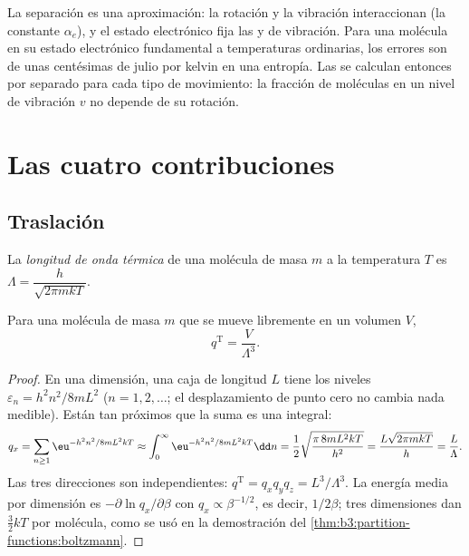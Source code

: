La separación es una aproximación: la rotación y la vibración interaccionan (la
constante $\alpha_e$), y el estado electrónico fija las  y de vibración.
Para una molécula en su estado electrónico fundamental a temperaturas
ordinarias, los errores son de unas centésimas de julio por kelvin en una
entropía. Las  se calculan entonces por separado para cada tipo de movimiento:
la fracción de moléculas en un nivel de vibración $v$ no depende de su
rotación.

\section{Las cuatro contribuciones}

\subsection*{Traslación}

\begin{definition}\label{def:b3:partition-functions:thermal-wavelength}
La \emph{longitud de onda térmica} de una molécula de masa $m$ a la
temperatura $T$ es $\Lambda = \dfrac{h}{\sqrt{2\pi mkT}}$.
\end{definition}

\begin{proposition}\label{prop:b3:partition-functions:q-trans}
Para una molécula de masa $m$ que se mueve libremente en un volumen $V$,
\[
  q^{\mathrm T} = \frac{V}{\Lambda^3}.
\]
\end{proposition}

\begin{proof}
En una dimensión, una caja de longitud $L$ tiene los niveles $\varepsilon_n = h^2n^2/8mL^2$
($n = 1, 2, \dots$; el desplazamiento de punto cero no cambia nada medible). Están tan
próximos que la suma es una integral:
\[
  q_x = \sum_{n\ge1}\eu^{-h^2n^2/8mL^2kT} \approx \int_0^\infty\eu^{-h^2n^2/8mL^2kT}\dd n
      = \frac12\sqrt{\frac{\pi\,8mL^2kT}{h^2}} = \frac{L\sqrt{2\pi mkT}}{h} = \frac{L}{\Lambda}.
\]
Las tres direcciones son independientes: $q^{\mathrm T} = q_xq_yq_z = L^3/\Lambda^3$. La
energía media por dimensión es $-\partial\ln q_x/\partial\beta$ con $q_x \propto \beta^{-1/2}$, es decir,
$1/2\beta$; tres dimensiones dan $\frac32kT$ por molécula, como se usó en la demostración del
\cref{thm:b3:partition-functions:boltzmann}.
\end{proof}


